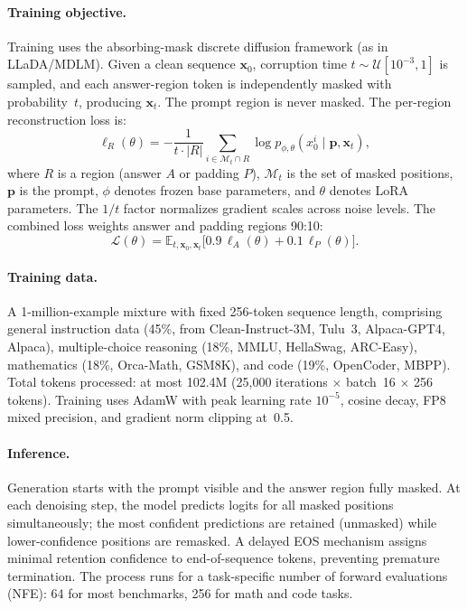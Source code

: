 \documentclass[11pt,a4paper]{article}
\begin{document}
\paragraph{Training objective.}
Training uses the absorbing-mask discrete diffusion framework (as in LLaDA/MDLM). Given a clean sequence $\mathbf{x}_0$, corruption time $t \sim \mathcal{U}[10^{-3}, 1]$ is sampled, and each answer-region token is independently masked with probability~$t$, producing $\mathbf{x}_t$. The prompt region is never masked. The per-region reconstruction loss is:
\begin{equation}
  \ell_R(\theta) = -\frac{1}{t \cdot |R|}\sum_{i \in \mathcal{M}_t \cap R} \log p_{\phi,\theta}(x_0^i \mid \mathbf{p}, \mathbf{x}_t),
\end{equation}
where $R$ is a region (answer $A$ or padding $P$), $\mathcal{M}_t$ is the set of masked positions, $\mathbf{p}$ is the prompt, $\phi$ denotes frozen base parameters, and $\theta$ denotes LoRA parameters. The $1/t$ factor normalizes gradient scales across noise levels. The combined loss weights answer and padding regions 90:10:
\begin{equation}
  \mathcal{L}(\theta) = \mathbb{E}_{t, \mathbf{x}_0, \mathbf{x}_t}\bigl[0.9\,\ell_A(\theta) + 0.1\,\ell_P(\theta)\bigr].
\end{equation}

\paragraph{Training data.}
A 1-million-example mixture with fixed 256-token sequence length, comprising general instruction data (45\%, from Clean-Instruct-3M, Tulu~3, Alpaca-GPT4, Alpaca), multiple-choice reasoning (18\%, MMLU, HellaSwag, ARC-Easy), mathematics (18\%, Orca-Math, GSM8K), and code (19\%, OpenCoder, MBPP). Total tokens processed: at most 102.4M (25{,}000 iterations $\times$ batch~16 $\times$ 256 tokens). Training uses AdamW with peak learning rate $10^{-5}$, cosine decay, FP8 mixed precision, and gradient norm clipping at~0.5.

\paragraph{Inference.}
Generation starts with the prompt visible and the answer region fully masked. At each denoising step, the model predicts logits for all masked positions simultaneously; the most confident predictions are retained (unmasked) while lower-confidence positions are remasked. A delayed EOS mechanism assigns minimal retention confidence to end-of-sequence tokens, preventing premature termination. The process runs for a task-specific number of forward evaluations (NFE): 64 for most benchmarks, 256 for math and code tasks.
\end{document}
